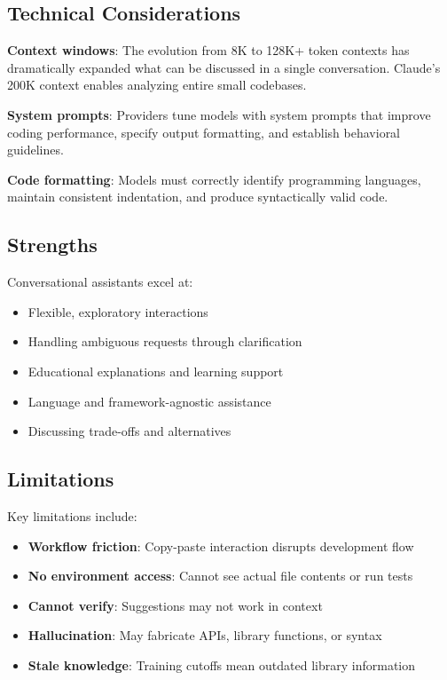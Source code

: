 \subsection{Technical Considerations}

\textbf{Context windows}: The evolution from 8K to 128K+ token contexts has dramatically expanded what can be discussed in a single conversation. Claude's 200K context enables analyzing entire small codebases.

\textbf{System prompts}: Providers tune models with system prompts that improve coding performance, specify output formatting, and establish behavioral guidelines.

\textbf{Code formatting}: Models must correctly identify programming languages, maintain consistent indentation, and produce syntactically valid code.

\subsection{Strengths}

Conversational assistants excel at:
\begin{itemize}
    \item Flexible, exploratory interactions
    \item Handling ambiguous requests through clarification
    \item Educational explanations and learning support
    \item Language and framework-agnostic assistance
    \item Discussing trade-offs and alternatives
\end{itemize}

\subsection{Limitations}

Key limitations include:
\begin{itemize}
    \item \textbf{Workflow friction}: Copy-paste interaction disrupts development flow
    \item \textbf{No environment access}: Cannot see actual file contents or run tests
    \item \textbf{Cannot verify}: Suggestions may not work in context
    \item \textbf{Hallucination}: May fabricate APIs, library functions, or syntax
    \item \textbf{Stale knowledge}: Training cutoffs mean outdated library information
\end{itemize}

